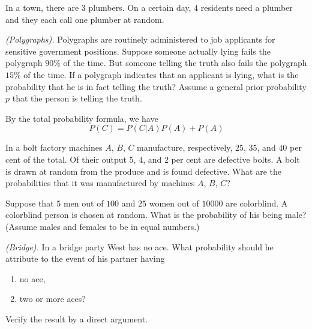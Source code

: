 \begin{problem}[Handout 3, \# 5]
  In a town, there are \(3\) plumbers. On a certain day, \(4\) residents
  need a plumber and they each call one plumber at random.
\end{problem}
\begin{solution}

\end{solution}
\newpage

\begin{problem}[Handout 4, \# 7]
  \emph{(Polygraphs).} Polygraphs are routinely administered to job
  applicants for sensitive government positions. Suppose someone actually
  lying fails the polygraph \(90\%\) of the time. But someone telling the
  truth also fails the polygraph \(15\%\) of the time. If a polygraph
  indicates that an applicant is lying, what is the probability that he is
  in fact telling the truth? Assume a general prior probability \(p\) that
  the person is telling the truth.
\end{problem}
\begin{solution}
  By the total probability formula, we have
  \[
    P(C)=P(C|A)P(A)+P(A)
  \]
\end{solution}
\newpage

\begin{problem}[Handout 4, \# 8]
  In a bolt factory machines \(A\), \(B\), \(C\) manufacture, respectively,
  \(25\), \(35\), and \(40\) per cent of the total. Of their output \(5\),
  \(4\), and \(2\) per cent are defective bolts. A bolt is drawn at random
  from the produce and is found defective. What are the probabilities that
  it was manufactured by machines \(A\), \(B\), \(C\)?
\end{problem}
\begin{solution}

\end{solution}
\newpage

\begin{problem}[Handout 4, \# 9]
  Suppose that \(5\) men out of \(100\) and \(25\) women out of
  \(\num{10000}\) are colorblind. A colorblind person is chosen at
  random. What is the probability of his being male? (Assume males and
  females to be in equal numbers.)
\end{problem}
\begin{solution}

\end{solution}
\newpage

\begin{problem}[Handout 4, \# 10]
  \emph{(Bridge).} In a bridge party West has no ace. What probability should
  he attribute to the event of his partner having
  \begin{enumerate}[label=(\alph*),noitemsep]
  \item no ace,
  \item two or more aces?
  \end{enumerate}
  Verify the result by a direct argument.
\end{problem}
\begin{solution}

\end{solution}
\newpage

